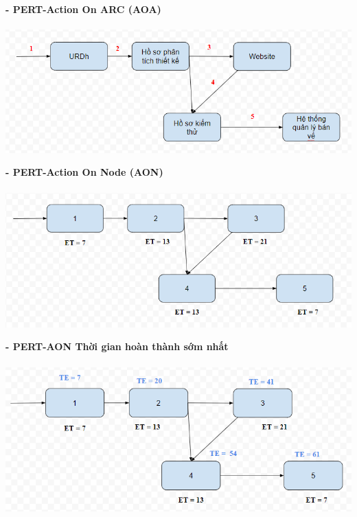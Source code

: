 \documentclass[12pt]{article}
\begin{document}
\hspace{1cm}\textbf{- PERT-Action On ARC (AOA) \\\\} 
\vspace*{0.5cm}    
\hspace{0.7cm}\includegraphics[width=14.5cm]{PERT3.png}
\vspace{0.5cm} 

\hspace{1cm}\textbf{- PERT-Action On Node (AON) \\\\} 
\vspace*{0.5cm}    
\hspace{0.7cm}\includegraphics[width=14.5cm]{PERT4.png}
\vspace{0.5cm} 

\hspace{1cm}\textbf{- PERT-AON Thời gian hoàn thành sớm nhất \\\\} 
\vspace*{0.5cm}    
\hspace{0.7cm}\includegraphics[width=14.5cm]{PERT5.png}
\vspace{0.5cm} 
\end{document}
